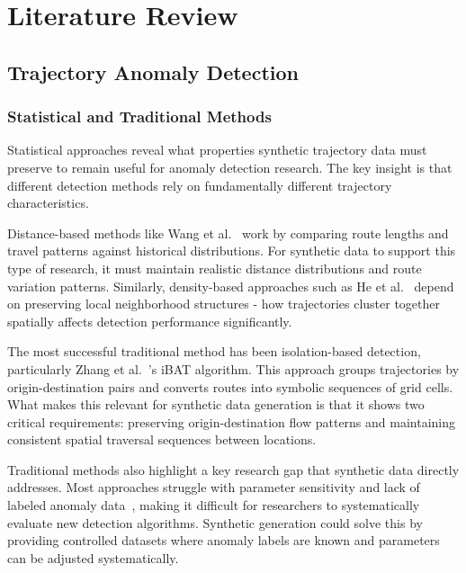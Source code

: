 \documentclass[runningheads]{llncs}
\begin{document}
\section{Literature Review}
\label{sec:literature-review}

\subsection{Trajectory Anomaly Detection}
\label{sec:anomaly-review}

\subsubsection{Statistical and Traditional Methods}
\label{sec:statistical-traditional}

Statistical approaches reveal what properties synthetic trajectory data must preserve to remain useful for anomaly detection research. The key insight is that different detection methods rely on fundamentally different trajectory characteristics.

Distance-based methods like Wang et al.~\cite{wang2020statistical} work by comparing route lengths and travel patterns against historical distributions. For synthetic data to support this type of research, it must maintain realistic distance distributions and route variation patterns. Similarly, density-based approaches such as He et al.~\cite{he2020enhanced} depend on preserving local neighborhood structures - how trajectories cluster together spatially affects detection performance significantly.

The most successful traditional method has been isolation-based detection, particularly Zhang et al.~\cite{zhang2019ibat}'s iBAT algorithm. This approach groups trajectories by origin-destination pairs and converts routes into symbolic sequences of grid cells. What makes this relevant for synthetic data generation is that it shows two critical requirements: preserving origin-destination flow patterns and maintaining consistent spatial traversal sequences between locations.

Traditional methods also highlight a key research gap that synthetic data directly addresses. Most approaches struggle with parameter sensitivity and lack of labeled anomaly data~\cite{zhang2019ibat}, making it difficult for researchers to systematically evaluate new detection algorithms. Synthetic generation could solve this by providing controlled datasets where anomaly labels are known and parameters can be adjusted systematically.
\end{document}
